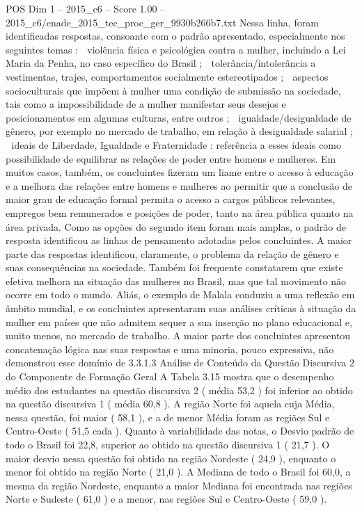 \begin{textsample}{POS Dim 1 – 2015\_c6 – Score 1.00 – 2015\_c6/enade\_2015\_tec\_proc\_ger\_9930b266b7.txt}
Nessa linha, foram identificadas respostas, consoante com o padrão apresentado, especialmente nos seguintes temas :  violência física e psicológica contra a mulher, incluindo a Lei Maria da Penha, no caso específico do Brasil ;  tolerância/intolerância a vestimentas, trajes, comportamentos socialmente estereotipados ;  aspectos socioculturais que impõem à mulher uma condição de submissão na sociedade, tais como a impossibilidade de a mulher manifestar seus desejos e posicionamentos em algumas culturas, entre outros ;  igualdade/desigualdade de gênero, por exemplo no mercado de trabalho, em relação à desigualdade salarial ;  ideais de Liberdade, Igualdade e Fraternidade : referência a esses ideais como possibilidade de equilibrar as relações de poder entre homens e mulheres.
Em muitos casos, também, os concluintes fizeram um liame entre o acesso à educação e a melhora das relações entre homens e mulheres ao permitir que a conclusão de maior grau de educação formal permita o acesso a cargos públicos relevantes, empregos bem remunerados e posições de poder, tanto na área pública quanto na área privada.
Como as opções do segundo item foram mais amplas, o padrão de resposta identificou as linhas de pensamento adotadas pelos concluintes.
A maior parte das respostas identificou, claramente, o problema da relação de gênero e suas consequências na sociedade.
Também foi frequente constatarem que existe efetiva melhora na situação das mulheres no Brasil, mas que tal movimento não ocorre em todo o mundo.
Aliás, o exemplo de Malala conduziu a uma reflexão em âmbito mundial, e os concluintes apresentaram suas análises críticas à situação da mulher em países que não admitem sequer a sua inserção no plano educacional e, muito menos, no mercado de trabalho.
A maior parte dos concluintes apresentou concatenação lógica nas suas respostas e uma minoria, pouco expressiva, não demonstrou esse domínio de 3.3.1.3 Análise de Conteúdo da Questão Discursiva 2 do Componente de Formação Geral A Tabela 3.15 mostra que o desempenho médio dos estudantes na questão discursiva 2 ( média 53,2 ) foi inferior ao obtido na questão discursiva 1 ( média 60,8 ).
A região Norte foi aquela cuja Média, nessa questão, foi maior ( 58,1 ), e a de menor Média foram as regiões Sul e Centro-Oeste ( 51,5 cada ).
Quanto à variabilidade das notas, o Desvio padrão de todo o Brasil foi 22,8, superior ao obtido na questão discursiva 1 ( 21,7 ).
O maior desvio nessa questão foi obtido na região Nordeste ( 24,9 ), enquanto o menor foi obtido na região Norte ( 21,0 ).
A Mediana de todo o Brasil foi 60,0, a mesma da região Nordeste, enquanto a maior Mediana foi encontrada nas regiões Norte e Sudeste ( 61,0 ) e a menor, nas regiões Sul e Centro-Oeste ( 59,0 ).

\end{textsample}
